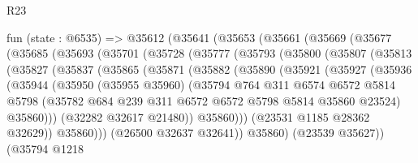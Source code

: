 \begin{lexlean}{R23}
\begin{coremodule}
  fun (state : @6535) =>
  @35612
    (@35641
      (@35653
        (@35661
          (@35669
            (@35677
              (@35685
                (@35693
                  (@35701
                    (@35728
                      (@35777
                        (@35793
                          (@35800
                            (@35807
                              (@35813
                                (@35827
                                  (@35837
                                    (@35865
                                      (@35871
                                        (@35882
                                          (@35890
                                            (@35921
                                              (@35927
                                                (@35936
                                                  (@35944
                                                    (@35950
                                                      (@35955 @35960)
                                                      (@35794
                                                        @764
                                                        @311
                                                        @6574
                                                        @6572
                                                        @5814
                                                        @5798
                                                        (@35782
                                                          @684
                                                          @239
                                                          @311
                                                          @6572
                                                          @6572
                                                          @5798
                                                          @5814
                                                          @35860
                                                          @23524)
                                                        @35860)))
                                                  (@32282 @32617 @21480))
                                                @35860)))
                                          (@23531 @1185 @28362 @32629))
                                        @35860)))
                                  (@26500 @32637 @32641))
                                @35860)
                              (@23539 @35627))
                            (@35794
                              @1218

\end{coremodule}
\end{lexlean}
